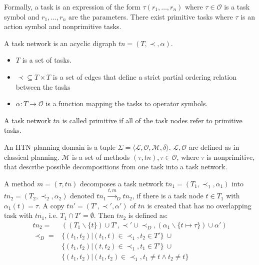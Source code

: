 
Formally, a task is an expression of the form $\tau(r_1,\dots,r_n)$ where $\tau \in \mathcal{O}$ is a task symbol and $r_1,\dots,r_n$ are the parameters.
There exist primitive tasks where $\tau$ is an action symbol and nonprimitive tasks.

\begin{definition}
  A task network is an acyclic digraph $tn = (T,\prec,\alpha)$.
  \begin{itemize}
    \item $T$ is a set of tasks.
    \item $\prec \subseteq T \times T$ is a set of edges that define a strict partial ordering relation between the tasks
    \item $\alpha: T \rightarrow \mathcal{O}$ is a function mapping the tasks to operator symbols.
  \end{itemize}
\end{definition}

A task network $tn$ is called primitive if all of the task nodes refer to primitive tasks. 

\begin{definition}
  An HTN planning domain is a tuple $\Sigma=\langle \mathcal{L}, \mathcal{O}, \mathcal{M}, \delta \rangle$.
  $\mathcal{L},\mathcal{O}$ are defined as in classical planning. 
  $\mathcal{M}$ is a set of methods $(\tau,tn), \tau \in \mathcal{O}$, where $\tau$ is nonprimitive, that describe possible decompositions from one task into a task network.
\end{definition}


\begin{definition}
  A method $m = (\tau,tn)$ decomposes a task network $tn_1 = (T_1,\prec_1,\alpha_1)$ into $tn_2 = (T_2,\prec_2,\alpha_2)$ denoted $tn_1 \xrightarrow{t,m}_D tn_2$, if there is a task node $t \in T_1$ with $\alpha_1(t) = \tau$.
  A copy $tn' = (T',\prec',\alpha')$ of $tn$ is created that has no overlapping task with $tn_1$, i.e. $T_1 \cap T' = \emptyset$.
  Then $tn_2$ is defined as:
  \begin{align*}
    tn_2 = & ((T_1 \backslash  \{t\}) \cup T', \prec' \cup \prec_D, (\alpha_1 \backslash \{t \mapsto \tau\}) \cup \alpha') \\
    \prec_D = & \{(t_1, t_2) | (t_1, t) \in \prec_1, t_2 \in T'\}~ \cup \\
    & \{(t_1, t_2) | (t, t_2) \in \prec_1, t_1 \in T '\}~ \cup \\
    & \{(t_1, t_2) | (t_1, t_2) \in \prec_1, t_1 \neq t \land t_2 \neq t\}\\
  \end{align*}
  \label{def:htn-task-dec}
\end{definition}

